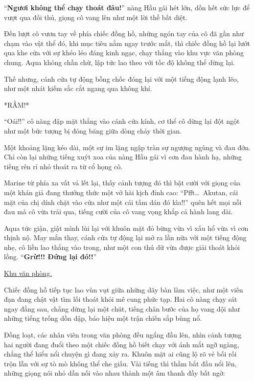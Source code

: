 \documentclass[../main.tex]{subfiles}
\begin{document}
``\textbf{Ngươi không thể chạy thoát đâu!}'' nàng Hầu gái hét lớn, dồn hết sức lực để vượt qua đối thủ, giọng cô vang lên như một lời thề bất diệt.

Đến lượt cô vươn tay về phía chiếc đồng hồ, những ngón tay của cô đã gần như chạm vào vật thể đó, khi mục tiêu nằm ngay trước mắt, thì chiếc đồng hồ lại lướt qua khe cửa với sự khéo léo đáng kinh ngạc, chạy thẳng vào khu vực văn phòng chung. Aqua không chần chừ, lập tức lao theo với tốc độ không thể dừng lại.

Thế nhưng, cánh cửa tự động bỗng chốc đóng lại với một tiếng động lạnh lẽo, như một nhát kiếm sắc cắt ngang qua không khí.

*RẦM!*

``Oái!!'' cô nàng đập mặt thẳng vào cánh cửa kính, cơ thể cô dừng lại đột ngột như một bức tượng bị đóng băng giữa dòng chảy thời gian.

Một khoảng lặng kéo dài, một sự im lặng ngập tràn sự ngượng ngùng và đau đớn. Chỉ còn lại những tiếng xuýt xoa của nàng Hầu gái vì cơn đau hành hạ, những tiếng rên rỉ nhỏ thoát ra từ cổ họng cô.

Marine từ phía xa vất vả lết lại, thấy cảnh tượng đó thì bật cười với giọng của một khán giả đang thưởng thức một vở hài kịch đỉnh cao: ``Pfft\dots\ Akutan, cái mặt của chị dính chặt vào cửa như một cái tấm dán đó kìa!!'' quên hết mọi nỗi đau mà cô vừa trải qua, tiếng cười của cô vang vọng khắp cả hành lang dài.

Aqua tức giận, giật mình lùi lại với khuôn mặt đỏ bừng vừa vì xấu hổ vừa vì cơn thịnh nộ. May mắn thay, cánh cửa tự động lại mở ra lần nữa với một tiếng động nhẹ, cô liền lao thẳng vào trong, như một con thú dữ vừa được giải thoát khỏi lồng. ``\textbf{Grừ!!! Đứng lại đó!!}''

\begin{center}
  \uline{Khu văn phòng.}
\end{center}

Chiếc đồng hồ tiếp tục lao vùn vụt giữa những dãy bàn làm việc, như một viên đạn đang chật vật tìm lối thoát khỏi mê cung phức tạp. Hai cô nàng chạy sát ngay đằng sau, chẳng dừng lại một chút, tiếng chân bước của họ vang dội như những tiếng trống dồn dập, báo hiệu một trận chiến sắp bùng nổ.

Đồng loạt, các nhân viên trong văn phòng đều ngẩng đầu lên, nhìn cảnh tượng hai người đang đuổi theo một chiếc đồng hồ biết chạy với ánh mắt ngỡ ngàng, chẳng thể hiểu nổi chuyện gì đang xảy ra. Khuôn mặt ai cũng lộ rõ vẻ bối rối trộn lẫn với sự tò mò không thể che giấu. Vài tiếng thì thầm bắt đầu nổi lên, những giọng nói nhỏ dần nối vào nhau thành một âm thanh đầy bất ngờ:
\end{document}

